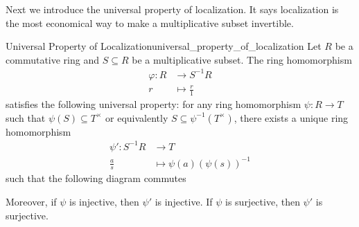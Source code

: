 Next we introduce the universal property of localization. It says localization is the most economical way to make a multiplicative subset invertible.


\begin{proposition}{Universal Property of Localization}{universal_property_of_localization}
    Let $R$ be a commutative ring and $S\subseteq R$ be a multiplicative subset. The ring homomorphism
    \begin{align*}
        \varphi:R&\longrightarrow S^{-1}R\\
         r&\longmapsto \frac{r}{1}
    \end{align*}
    satisfies the following universal property: for any ring homomorphism $\psi:R\to T$ such that $\psi(S)\subseteq T^\times$ or equivalently $S\subseteq \psi^{-1}(T^\times)$, there exists a unique ring homomorphism 
    \begin{align*}
        \psi':S^{-1}R&\longrightarrow T\\
        \frac{a}{s}&\longmapsto \psi(a)(\psi(s))^{-1}
    \end{align*}
    such that the following diagram commutes
    \begin{center}
    \end{center}
    Moreover, if $\psi$ is injective, then $\psi'$ is injective. If $\psi$ is surjective, then $\psi'$ is surjective.
\end{proposition}

